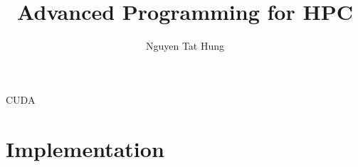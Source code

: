 \documentclass{article}
\title{Advanced Programming for HPC}
\author{Nguyen Tat Hung}
\begin{document}
   \maketitle
    CUDA
    \section*{Implementation}
    
\end{document}
